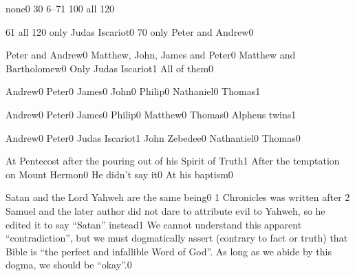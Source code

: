 

{none}{0}
{3}{0}
{6--7}{1}
{10}{0}
{all 12}{0}
\qstop


{6}{1}
{all 12}{0}
{only Judas Iscariot}{0}
{7}{0}
{only Peter and Andrew}{0}
\qstop

{Peter and Andrew}{0}
{Matthew, John, James and Peter}{0}
{Matthew and Bartholomew}{0}
{Only Judas Iscariot}{1}
{All of them}{0}
\qstop

{Andrew}{0}
{Peter}{0}
{James}{0}
{John}{0}
{Philip}{0}
{Nathaniel}{0}
{Thomas}{1}
\qstop

{Andrew}{0}
{Peter}{0}
{James}{0}
{Philip}{0}
{Matthew}{0}
{Thomas}{0}
{Alpheus twins}{1}
\qstop


{Andrew}{0}
{Peter}{0}
{Judas Iscariot}{1}
{John Zebedee}{0}
{Nathantiel}{0}
{Thomas}{0}
\qstop


{At Pentecost after the pouring out of his Spirit of Truth}{1}
{After the temptation on Mount Hermon}{0}
{He didn't say it}{0}
{At his baptism}{0}
\qstop


{Satan and the Lord Yahweh are the same being}{0}
{1 Chronicles was written after 2 Samuel and the later author did not dare to attribute evil to Yahweh, so he edited it to say ``Satan'' instead}{1}
{We cannot understand this apparent ``contradiction'', but we must dogmatically assert (contrary to fact or truth) that Bible is ``the perfect and infallible Word of God''. As long as we abide by this dogma, we should be ``okay''.}{0}
\qstop

